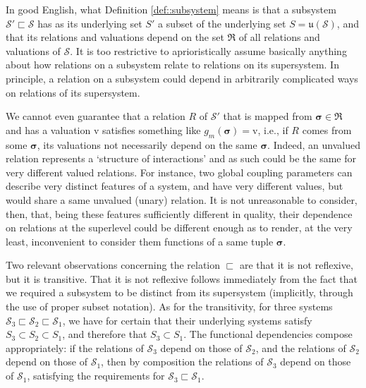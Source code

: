 \begin{remark} \label{rem::independence}
In good English, what Definition \ref{def::subsystem} means is that a subsystem $\mathcal{S}' \sqsubset \mathcal{S}$ has as its underlying set $S'$ a subset of the underlying set $S = \mathfrak{u}(\mathcal{S})$, and that its relations and valuations depend on the set $\mathfrak{R}$ of all relations and valuations of $\mathcal{S}$. It is too restrictive to aprioristically assume basically anything about how relations on a subsystem relate to relations on its supersystem. In principle, a relation on a subsystem could depend in arbitrarily complicated ways on relations of its supersystem. 

We cannot even guarantee that a relation $R$ of $\mathcal{S}'$ that is mapped from $\boldsymbol{\sigma} \in \mathfrak{R}$ and has a valuation $\mathrm{v}$ satisfies something like $g_m(\boldsymbol{\sigma}) = \mathrm{v}$, i.e., if $R$ comes from some $\boldsymbol{\sigma}$, its valuations not necessarily depend on the same $\boldsymbol{\sigma}$. Indeed, an unvalued relation represents a `structure of interactions' and as such could be the same for very different valued relations. For instance, two global coupling parameters can describe very distinct features of a system, and have very different values, but would share a same unvalued (unary) relation. It is not unreasonable to consider, then, that, being these features sufficiently different in quality, their dependence on relations at the superlevel could be different enough as to render, at the very least, inconvenient to consider them functions of a same tuple $\boldsymbol{\sigma}$.
\end{remark}

\begin{remark} \label{rem::transitivity}
Two relevant observations concerning the relation $\sqsubset$ are that it is not reflexive, but it is transitive. That it is not reflexive follows immediately from the fact that we required a subsystem to be distinct from its supersystem (implicitly, through the use of proper subset notation). As for the transitivity, for three systems $\mathcal{S}_3 \sqsubset \mathcal{S}_2 \sqsubset \mathcal{S}_1$, we have for certain that their underlying systems satisfy $S_3 \subset S_2 \subset S_1$, and therefore that $S_3 \subset S_1$. The functional dependencies compose appropriately: if the relations of $\mathcal{S}_3$ depend on those of $\mathcal{S}_2$, and the relations of $\mathcal{S}_2$ depend on those of $\mathcal{S}_1$, then by composition the relations of $\mathcal{S}_3$ depend on those of $\mathcal{S}_1$, satisfying the requirements for $\mathcal{S}_3 \sqsubset \mathcal{S}_1$.
\end{remark}

